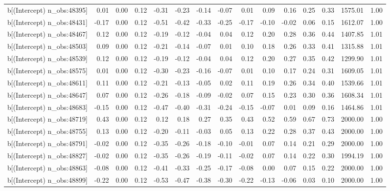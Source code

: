 \begin{table}[ht]
\begin{tabular}{rrrrrrrrrrrrrrr}
  b[(Intercept) n\_obs:48395] & 0.01 & 0.00 & 0.12 & -0.31 & -0.23 & -0.14 & -0.07 & 0.01 & 0.09 & 0.16 & 0.25 & 0.33 & 1575.01 & 1.00 \\ 
  b[(Intercept) n\_obs:48431] & -0.17 & 0.00 & 0.12 & -0.51 & -0.42 & -0.33 & -0.25 & -0.17 & -0.10 & -0.02 & 0.06 & 0.15 & 1612.07 & 1.00 \\ 
  b[(Intercept) n\_obs:48467] & 0.12 & 0.00 & 0.12 & -0.19 & -0.12 & -0.04 & 0.04 & 0.12 & 0.20 & 0.28 & 0.36 & 0.44 & 1407.85 & 1.01 \\ 
  b[(Intercept) n\_obs:48503] & 0.09 & 0.00 & 0.12 & -0.21 & -0.14 & -0.07 & 0.01 & 0.10 & 0.18 & 0.26 & 0.33 & 0.41 & 1315.88 & 1.01 \\ 
  b[(Intercept) n\_obs:48539] & 0.12 & 0.00 & 0.12 & -0.19 & -0.12 & -0.04 & 0.04 & 0.12 & 0.20 & 0.27 & 0.35 & 0.42 & 1299.90 & 1.01 \\ 
  b[(Intercept) n\_obs:48575] & 0.01 & 0.00 & 0.12 & -0.30 & -0.23 & -0.16 & -0.07 & 0.01 & 0.10 & 0.17 & 0.24 & 0.31 & 1609.05 & 1.01 \\ 
  b[(Intercept) n\_obs:48611] & 0.11 & 0.00 & 0.12 & -0.21 & -0.13 & -0.05 & 0.02 & 0.11 & 0.19 & 0.26 & 0.34 & 0.40 & 1539.66 & 1.01 \\ 
  b[(Intercept) n\_obs:48647] & 0.07 & 0.00 & 0.12 & -0.26 & -0.18 & -0.09 & -0.02 & 0.07 & 0.15 & 0.23 & 0.30 & 0.36 & 1608.34 & 1.01 \\ 
  b[(Intercept) n\_obs:48683] & -0.15 & 0.00 & 0.12 & -0.47 & -0.40 & -0.31 & -0.24 & -0.15 & -0.07 & 0.01 & 0.09 & 0.16 & 1464.86 & 1.01 \\ 
  b[(Intercept) n\_obs:48719] & 0.43 & 0.00 & 0.12 & 0.12 & 0.18 & 0.27 & 0.35 & 0.43 & 0.52 & 0.59 & 0.67 & 0.73 & 2000.00 & 1.00 \\ 
  b[(Intercept) n\_obs:48755] & 0.13 & 0.00 & 0.12 & -0.20 & -0.11 & -0.03 & 0.05 & 0.13 & 0.22 & 0.28 & 0.37 & 0.43 & 2000.00 & 1.00 \\ 
  b[(Intercept) n\_obs:48791] & -0.02 & 0.00 & 0.12 & -0.35 & -0.26 & -0.18 & -0.10 & -0.01 & 0.07 & 0.14 & 0.21 & 0.29 & 2000.00 & 1.00 \\ 
  b[(Intercept) n\_obs:48827] & -0.02 & 0.00 & 0.12 & -0.35 & -0.26 & -0.19 & -0.11 & -0.02 & 0.07 & 0.14 & 0.22 & 0.30 & 1994.19 & 1.00 \\ 
  b[(Intercept) n\_obs:48863] & -0.08 & 0.00 & 0.12 & -0.41 & -0.33 & -0.25 & -0.17 & -0.08 & 0.00 & 0.07 & 0.15 & 0.22 & 2000.00 & 1.00 \\ 
  b[(Intercept) n\_obs:48899] & -0.22 & 0.00 & 0.12 & -0.53 & -0.47 & -0.38 & -0.30 & -0.22 & -0.13 & -0.06 & 0.03 & 0.10 & 2000.00 & 1.00 \\ 

\end{tabular}
\end{table}
